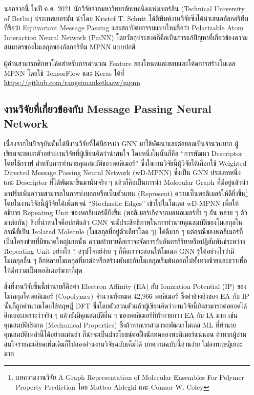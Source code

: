 นอกจากนี้ ในปี ค.ศ. 2021 นักวิจัยจากมหาวิทยาลัยเทคนิคแห่งเบอร์ลิน (Technical University of Berlin) ประเทศเยอรมัน นำโดย Kristof T. Sch\"{u}tt ได้ตีพิมพ์งานวิจัยซึ่งได้นำเสนออัลกอริทึมที่ชื่อว่า Equivariant Message Passing และสถาปัตยกรรมแบบใหม่ชื่อว่า Polarizable Atom Interaction Neural Network (PaiNN)\autocite{schutt2021} โดยวัตถุประสงค์ก็คือเป็นการแก้ปัญหาที่เกี่ยวข้องความสมมาตรของโมเลกุลของอัลกอริทึม MPNN แบบปกติ

ผู้อ่านสามารถศึกษาโค้ดสำหรับการคำนวณ Feature ของโหนดและขอบและโค้ดการสร้างโมเดล MPNN โดยใช้ TensorFlow และ Keras ได้ที่ \url{https://github.com/rangsimanketkaew/mpnn}

\subsection{งานวิจัยที่เกี่ยวข้องกับ Message Passing Neural Network}
\label{ssec:mpnn_papers}

เนื่องจากในปัจจุบันนั้นได้มีงานวิจัยที่ได้มีการนำ GNN มาใช้พัฒนาและต่อยอดเป็นจำนวนมาก ผู้เขียนจะขอยกตัวอย่างงานวิจัยที่ผู้เขียนคิดว่าน่าสนใจ โดยหนึ่งในนั้นก็คือ \enquote{การพัฒนา Descriptor โดยใช้กราฟ สำหรับการทำนายคุณสมบัติของพอลิเมอร์}\autocite{aldeghi2022} ซึ่งในงานวิจัยนี้ผู้วิจัยได้เลือกใช้ Weighted Directed Message Passing Neural Network (wD-MPNN) ซึ่งเป็น GNN ประเภทหนึ่ง และ Descriptor ที่ได้พัฒนาขึ้นมานั้นจริง ๆ แล้วก็คือเป็นการนำ Molecular Graph ที่มีอยู่แล้วนำมาปรับเพิ่มความสามารถในการบ่งบอกหรือเป็นตัวแทน (Represent) ความเป็นพอลิเมอร์ให้ดียิ่งขึ้น\footnote{บทความงานวิจัย A Graph Representation of Molecular Ensembles For Polymer Property Prediction โดย Matteo Aldeghi และ Connor W. Coley} โดยในงานวิจัยนี้ผู้วิจัยได้เพิ่มพจน์ \enquote{Stochastic Edges} เข้าไปในโมเดล wD-MPNN เพื่อให้อธิบาย Repeating Unit ของพอลิเมอร์ดียิ่งขึ้น (พอลิเมอร์เกิดจากมอนอเมอร์ซ้ำ ๆ กัน หลาย ๆ ตัวมาต่อกัน) สิ่งที่น่าสนใจคือปกติแล้ว GNN จะมีประสิทธิภาพในการทำนายคุณสมบัติของโมเลกุลในกรณีที่เป็น Isolated Molecule (โมเลกุลที่อยู่ตัวเดียวโดด ๆ) ได้ดีมาก ๆ แต่กรณีของพอลิเมอร์ที่เป็นโครงข่ายที่มีขนาดใหญ่มากนั้น ความท้าทายคือเราจะจัดการกับอันตรกิริยาหรือปฏิสัมพันธ์ระหว่าง Repeating Unit อย่างไร ? สรุปโจทย์ง่าย ๆ ก็คือเราจะสอนให้โมเดล GNN รู้ได้อย่างไรว่ามีโมเลกุลอื่น ๆ อีกหลายโมเลกุลที่มาต่อหรือสร้างพันธะกับโมเลกุลเริ่มต้นออกไปทั้งทางซ้ายและขวาเพื่อให้มีความเป็นพอลิเมอร์มากที่สุด

สิ่งที่งานวิจัยชิ้นนี้ทำนายก็คือค่า Electron Affinity (EA) กับ Ionization Potential (IP) ของโมเลกุลโคพอลิเมอร์ (Copolymer) จำนวนทั้งหมด 42,966 พอลิเมอร์ ซึ่งค่าอ้างอิงของ EA กับ IP นั้นก็ถูกคำนวณโดยใช้ทฤษฎี DFT ซึ่งโดยตัวส่วนตัวแล้วผู้เขียนคิดว่างานวิจัยนี้ยังสามารถต่อยอดได้อีกเยอะเพราะว่าจริง ๆ แล้วยังมีคุณสมบัติอื่น ๆ ของพอลิเมอร์ที่ท้าทายกว่า EA กับ IA มาก เช่น คุณสมบัติเชิงกล (Mechanical Properties) ซึ่งถ้าหากเราสามารถพัฒนาโมเดล ML ที่ทำนายคุณสมบัติเหล่านี้ได้อย่างแม่นยำ ก็น่าจะเป็นประโยชน์ต่อฝั่งนักทดลองพอลิเมอร์แน่นอน ถ้าหากผู้อ่านสนใจรายละเอียดเพิ่มเติมก็ไปลองอ่านงานวิจัยฉบับเต็มได้ บทความฉบับนี้อ่านง่าย ไม่ลงทฤษฎีเยอะมาก

